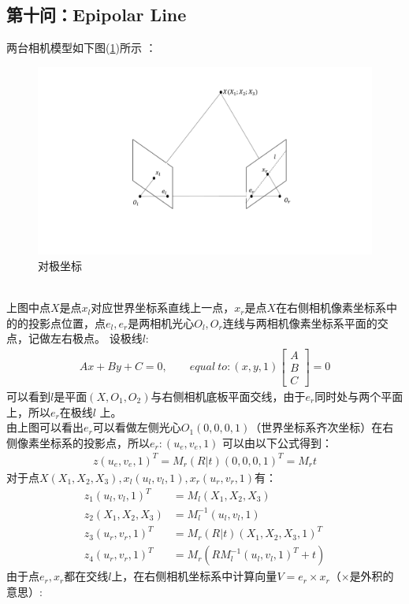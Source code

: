 \documentclass[UTF8]{ctexart}
\begin{document}
\subsection{第十问：Epipolar Line}
两台相机模型如下图(\ref{fig:polar_geometry})所示\cite{stereoVersion180903} \cite{wikifundamentalMatrix180903}：
\begin{figure}[htp]%
	\centering  %
	\includegraphics[width=0.5\linewidth]{./figures/polar_geometry.pdf} %
	\caption{对极坐标}  %
	\label{fig:polar_geometry}   %
\end{figure}\\
上图中点$X$是点$x_l$对应世界坐标系直线上一点，$x_r$是点$X$在右侧相机像素坐标系中的的投影点位置，点$e_l,e_r$是两相机光心$O_l,O_r$连线与两相机像素坐标系平面的交点，记做左右极点。
设极线$l:$
\begin{align}
Ax+By+C=0,\qquad equal\ to:(x,y,1)\left [ \begin{array}{c} A \\B \\C \end{array} \right ]=0\label{equ:poline}
\end{align}
可以看到$l$是平面$(X,O_1,O_2)$与右侧相机底板平面交线，由于$e_r$同时处与两个平面上，所以$e_r$在极线$l$ 上。\\
由上图可以看出$e_r$可以看做左侧光心$O_1(0,0,0,1)$（世界坐标系齐次坐标）在右侧像素坐标系的投影点，所以$e_r:(u_e,v_e,1)$ 可以由以下公式得到：
\begin{align}
z(u_e,v_e,1)^T=M_r(R|t)(0,0,0,1)^T=M_rt
\end{align}
对于点$X(X_1,X_2,X_3),x_l(u_l,v_l,1),x_r(u_r,v_r,1)$有：
\begin{align*}
z_1(u_l,v_l,1)^T&=M_l(X_1,X_2,X_3)\\
z_2(X_1,X_2,X_3)&=M_l^{-1}(u_l,v_l,1)\\
z_3(u_r,v_r,1)^T&=M_r(R|t)(X_1,X_2,X_3,1)^T\\
z_4(u_r,v_r,1)^T&=M_r(RM_l^{-1}(u_l,v_l,1)^T+t)
\end{align*}
由于点$e_r,x_r$都在交线$l$上，在右侧相机坐标系中计算向量$V=e_r \times x_r$（$\times$是外积的意思）:
\end{document}

